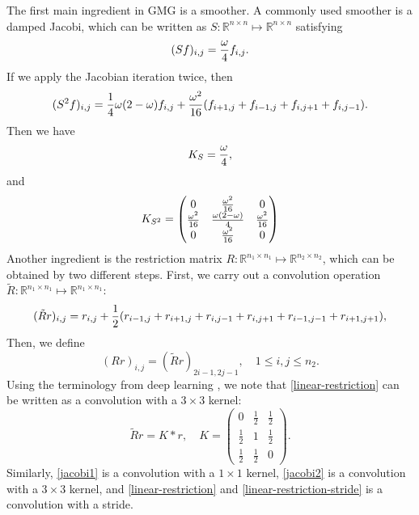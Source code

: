 The first main ingredient in GMG is a smoother.  A commonly used smoother is a
damped Jacobi,  which can be written as $S:\mathbb R^{n\times n}\mapsto
\mathbb R^{n\times n}$ satisfying
\begin{equation}
\label{jacobi1}
(Sf)_{i,j}={\omega\over 4}f_{i,j}.
\end{equation}
If we apply the Jacobian iteration twice, then
\begin{equation}
\label{jacobi2}
(S^2f)_{i,j}
={1\over 4}\omega(2-\omega)f_{i,j}+{\omega^2\over 16}(f_{i+1,j}+f_{i-1,j}+f_{i,j+1}+f_{i,j-1}).
\end{equation}
Then we have 
\begin{equation}\label{eq:kernel-S}
K_S = {\omega \over 4},
\end{equation}
and 
\begin{equation}\label{eq:kernel-S2}
K_{S^2} = \begin{pmatrix}
0 & \frac{\omega^2}{16} & 0 \\
\frac{\omega^2}{16} & {\omega(2-\omega) \over 4} & \frac{\omega^2}{16}  \\
0 & \frac{\omega^2}{16}  & 0
\end{pmatrix}
\end{equation}
Another ingredient is the restriction matrix $R: \mathbb R^{n_1\times
	n_1}\mapsto \mathbb R^{n_2\times n_2}$, which can be obtained by two
different steps. First, we carry out a convolution operation $\tilde
R: \mathbb R^{n_1\times n_1}\mapsto \mathbb R^{n_1\times n_1}$:
\begin{equation}
\label{linear-restriction}
(\tilde Rr)_{i,j}=r_{i,j}+{1\over 2}(r_{i-1,j}+r_{i+1,j}+r_{i,j-1}+r_{i,j+1}+r_{i-1,j-1}+r_{i+1,j+1}),
\end{equation}
Then, we define
\begin{equation}
\label{linear-restriction-stride}
(Rr)_{i,j}=(\tilde R r)_{2i-1,2j-1}, \quad 1\le i, j \le n_2.
\end{equation}
Using the terminology from deep learning \cite{goodfellow2017deep}, 
we note that \eqref{linear-restriction} can be written as a
convolution with a $3\times3$ kernel:
\begin{equation}
\label{convolution}
\tilde Rr=K*r,\quad K=\left ( \begin{array}{ccc}
0 &\frac{1}{2}&\frac{1}{2}\\
\frac{1}{2}& 1&\frac{1}{2}\\
\frac{1}{2}&\frac{1}{2}& 0
\end{array}\right ).
\end{equation}
Similarly, \eqref{jacobi1} is a convolution with a $1\times1$ kernel, 
\eqref{jacobi2} is a convolution with a $3\times 3$ kernel, and
\eqref{linear-restriction} and \eqref{linear-restriction-stride} is a
convolution with a stride. 

